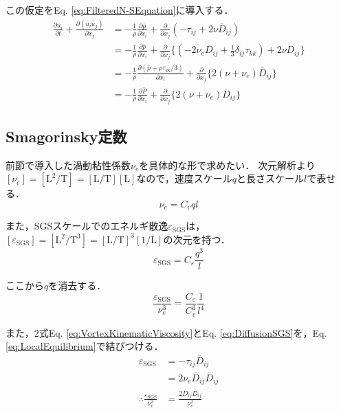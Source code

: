 \documentclass[12pt,a4paper]{jsarticle}
\begin{document}
この仮定をEq. \ref{eq:FilteredN-SEquation}に導入する．
\begin{align}
  \frac{\partial \bar{u}_i}{\partial t} +\frac{\partial (\bar{u}_i \bar{u}_j)}{\partial x_j} &= -\frac{1}{\rho} \frac{\partial \bar{p}}{\partial x_i} +\frac{\partial}{\partial x_j} (-\tau_{ij} +2 \nu \overline{D}_{ij}) \nonumber \\
    &= -\frac{1}{\rho} \frac{\partial \bar{p}}{\partial x_i} +\frac{\partial}{\partial x_j} \bigl\{ (-2\nu_e \overline{D}_{ij} +\frac{1}{3} \delta_{ij} \tau_{kk}) +2 \nu \overline{D}_{ij} \bigr\} \nonumber \\
    &= -\frac{1}{\rho} \frac{\partial (\bar{p}+\rho \tau_{kk}/3 )}{\partial x_i} +\frac{\partial}{\partial x_j} \{2 (\nu +\nu_e) \overline{D}_{ij}\} \nonumber \\
    &= -\frac{1}{\rho} \frac{\partial \bar{P}}{\partial x_i} +\frac{\partial}{\partial x_j} \{2 (\nu +\nu_e) \overline{D}_{ij}\} \tag{7.34}
\label{eq:SmagorinskyNSEquation}
\end{align}


\subsection{Smagorinsky定数}
\label{subsec:SmagorinskyConstant}

前節で導入した渦動粘性係数$\nu_e$を具体的な形で求めたい．
次元解析より$[\nu_e] =[\mathrm{L}^2/\mathrm{T}] =[\mathrm{L}/\mathrm{T}][\mathrm{L}]$なので，速度スケール$q$と長さスケール$l$で表せる．
\begin{equation}
  \nu_e = C_v ql \tag{7.35}
\label{eq:VortexKinematicViscosity}
\end{equation}

また，SGSスケールでのエネルギ散逸$\varepsilon_{\mathrm{SGS}}$は，$[\varepsilon_{\mathrm{SGS}}] =[\mathrm{L}^2/\mathrm{T}^3] =[\mathrm{L}/\mathrm{T}]^3 [1/\mathrm{L}]$の次元を持つ．
\begin{equation}
  \varepsilon_{\mathrm{SGS}} = C_\varepsilon \frac{q^3}{l}
  \label{eq:DiffusionSGS}
\end{equation}

ここから$q$を消去する．
\begin{equation}
  \frac{\varepsilon_{\mathrm{SGS}}}{\nu_e^3} = \frac{C_\varepsilon}{C_v^3} \frac{1}{l^4}
\end{equation}


また，2式Eq. \ref{eq:VortexKinematicViscosity}とEq. \ref{eq:DiffusionSGS}を，Eq. \ref{eq:LocalEquilibrium}で結びつける．
\begin{align}
  \varepsilon_{\mathrm{SGS}} &= -\tau_{ij} \overline{D}_{ij} \nonumber \\
    &= 2 \nu_e \overline{D}_{ij} \overline{D}_{ij} \nonumber \\
  \therefore \frac{\varepsilon_{\mathrm{SGS}}}{\nu_e^3} &= \frac{2 \overline{D}_{ij} \overline{D}_{ij}}{\nu_e^2}
\end{align}
\end{document}
